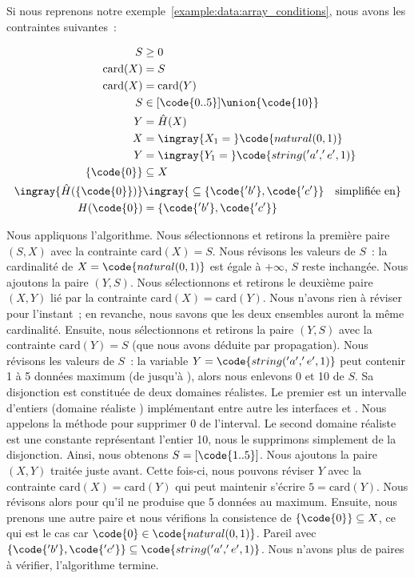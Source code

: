 \begin{example}

Si nous reprenons notre exemple~\ref{example:data:array_conditions}, nous avons
les contraintes suivantes~:

\begin{align*}
%
S & \geq 0 \\
%
\mathrm{card}(X) & = S \\
%
\mathrm{card}(X) & = \mathrm{card}(Y) \\
%
S & \in [\code{0..5}] \union \{\code{10}\} \\
%
Y & = \hat{H}(X) \\
%
X & = \ingray{X_1 =\;} \code{natural(0, 1)} \\
%
Y & = \ingray{Y_1 =\;} \code{string('a', 'e', 1)} \\
%
\{\code{0}\} & \subseteq X \\
%
\ingray{\hat{H}(\{\code{0}\})} & \ingray{\;\subseteq \{\code{'b'}, \code{'c'}\}
                                 \quad \text{simplifiée en}} \\
%
H(\code{0}) & = \{\code{'b'}, \code{'c'}\}
%
\end{align*}

Nous appliquons l'algorithme. Nous sélectionnons et retirons la première paire
$(S, X)$ avec la contrainte $\mathrm{card}(X) = S$. Nous révisons les valeurs de
$S$~: la cardinalité de $X = \code{natural(0, 1)}$ est égale à $+\infty$, $S$
reste inchangée. Nous ajoutons la paire $(Y, S)$. Nous sélectionnons et retirons
le deuxième paire $(X, Y)$ lié par la contrainte $\mathrm{card}(X) =
\mathrm{card}(Y)$. Nous n'avons rien à réviser pour l'instant~; en revanche,
nous savons que les deux ensembles auront la même cardinalité. Ensuite, nous
sélectionnons et retirons la paire $(Y, S)$ avec la contrainte $\mathrm{card}(Y)
= S$ (que nous avons déduite par propagation). Nous révisons les valeurs de
$S$~: la variable $Y = \code{string('a', 'e', 1)}$ peut contenir 1 à 5 données
maximum (de  jusqu'à ), alors nous enlevons 0 et 10 de $S$. Sa
disjonction est constituée de deux domaines réalistes. Le premier est un
intervalle d'entiers (domaine réaliste ) implémentant entre
autre les interfaces  et . Nous appelons la
méthode  pour supprimer 0 de l'interval. Le second domaine
réaliste est une constante représentant l'entier 10, nous le supprimons
simplement de la disjonction. Ainsi, nous obtenons $S = [\code{1..5}]$. Nous
ajoutons la paire $(X, Y)$ traitée juste avant. Cette fois-ci, nous pouvons
réviser $Y$ avec la contrainte $\mathrm{card}(X) = \mathrm{card}(Y)$ qui peut
maintenir s'écrire $5 = \mathrm{card}(Y)$. Nous révisons alors  pour qu'il ne produise que 5 données au maximum. Ensuite, nous prenons une
autre paire et nous vérifions la consistence de $\{\code{0}\} \subseteq X$, ce
qui est le cas car $\code{0} \in \code{natural(0, 1)}$. Pareil avec
$\{\code{'b'}, \code{'c'}\} \subseteq \code{string('a', 'e', 1)}$. Nous n'avons
plus de paires à vérifier, l'algorithme termine.

\end{example}

